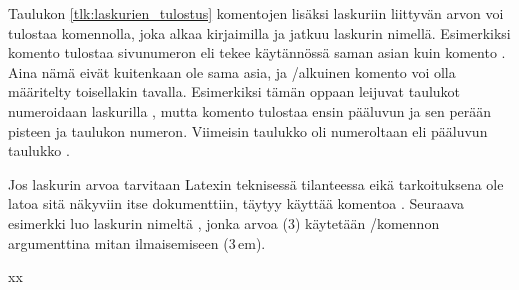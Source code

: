 
Taulukon \ref{tlk:laskurien_tulostus} komentojen lisäksi laskuriin
liittyvän arvon voi tulostaa komennolla, joka alkaa kirjaimilla
 ja jatkuu laskurin nimellä. Esimerkiksi komento
 tulostaa sivunumeron eli tekee käytännössä saman
asian kuin komento . Aina nämä eivät
kuitenkaan ole sama asia, ja \-/alkuinen komento voi
olla määritelty toisellakin tavalla. Esimerkiksi tämän oppaan leijuvat
taulukot numeroidaan laskurilla , mutta komento
 tulostaa ensin pääluvun ja sen perään pisteen
ja taulukon numeron. Viimeisin taulukko oli numeroltaan \thetable{} eli
pääluvun  taulukko .

Jos laskurin arvoa tarvitaan Latexin teknisessä tilanteessa eikä
tarkoituksena ole latoa sitä näkyviin itse dokumenttiin, täytyy käyttää
komentoa . Seuraava esimerkki luo laskurin nimeltä
, jonka arvoa (3) käytetään \-/komennon
argumenttina mitan ilmaisemiseen (3\,em).


\begin{koodilohkosis}
  \setcounter{mitta}{3}
  xx
\end{koodilohkosis}

